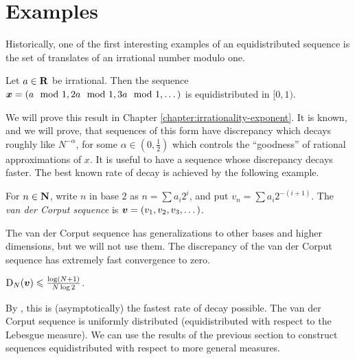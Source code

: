 \section{Examples}

Historically, one of the first interesting examples of an equidistributed 
sequence is the set of translates  of an irrational number modulo one. 

\begin{theorem}
Let $a\in \mathbf{R}$ be irrational. Then the sequence 
${\boldsymbol x}=(a\mod 1,2a\mod 1,3a\mod 1,\dots)$ is equidistributed in $[0,1)$. 
\end{theorem}

We will prove this result in Chapter \ref{chapter:irrationality-exponent}. It 
is known, and we will prove, that 
sequences of this form have discrepancy which decays roughly like 
$N^{-\alpha}$, for some $\alpha\in \left(0,\frac 1 2\right)$ which controls the 
``goodness'' of rational approximations of $x$. It is useful to have a sequence 
whose discrepancy decays faster. The best known rate of decay is achieved by 
the following example. 

\begin{definition}\label{def:van-der-corput}
For $n\in \mathbf{N}$, write $n$ in base $2$ as $n = \sum a_i 2^i$, and put 
$v_n = \sum a_i 2^{-(i+1)}$. The \emph{van der Corput sequence} is 
${\boldsymbol v} = (v_1,v_2,v_3,\dots)$.
\end{definition}

The van der Corput sequence has generalizations to other bases and higher 
dimensions, but we will not use them. The discrepancy of the van der Corput 
sequence has extremely fast convergence to zero. 

\begin{lemma}
\label{lem:vdc-disc}
$\operatorname{D}_N({\boldsymbol v}) \leqslant \frac{\log(N+1)}{N\log 2}$. 
\end{lemma}

By \cite[Ch.~2 Th.~2.3]{kuipers-niederreiter-1974}, this is (asymptotically) 
the fastest rate of decay possible. 
The van der Corput sequence is uniformly distributed (equidistributed with 
respect to the Lebesgue measure). We can use the results of the previous 
section to construct sequences equidistributed with respect to more general 
measures. 

